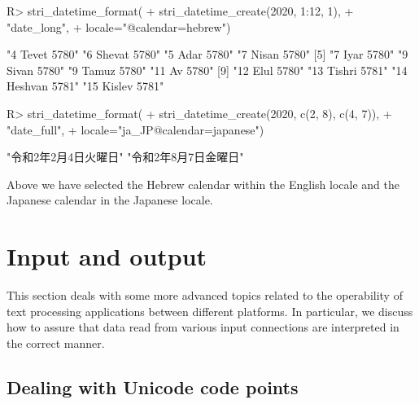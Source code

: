 \documentclass[nojss]{jss}
\begin{document}
\begin{Schunk}
\begin{Sinput}
R> stri_datetime_format(
+    stri_datetime_create(2020, 1:12, 1),
+    "date_long",
+    locale="@calendar=hebrew")
\end{Sinput}
\begin{Soutput}
 [1] "4 Tevet 5780"    "6 Shevat 5780"   "5 Adar 5780"     "7 Nisan 5780"
 [5] "7 Iyar 5780"     "9 Sivan 5780"    "9 Tamuz 5780"    "11 Av 5780"
 [9] "12 Elul 5780"    "13 Tishri 5781"  "14 Heshvan 5781" "15 Kislev 5781"
\end{Soutput}
\begin{Sinput}
R> stri_datetime_format(
+    stri_datetime_create(2020, c(2, 8), c(4, 7)),
+    "date_full",
+    locale="ja_JP@calendar=japanese")
\end{Sinput}
\begin{Soutput}
[1] "令和2年2月4日火曜日" "令和2年8月7日金曜日"
\end{Soutput}
\end{Schunk}

\noindent
Above we have selected the Hebrew calendar within the
English locale and the Japanese calendar in the Japanese locale.












\section{Input and output}\label{Sec:io}

This section deals with some more advanced topics related to the
operability of text processing applications
between different platforms. In particular, we discuss
how to assure that data read from various input connections
are interpreted in the correct manner.



\subsection{Dealing with Unicode code points}\label{Sec:codepoints}
\end{document}
